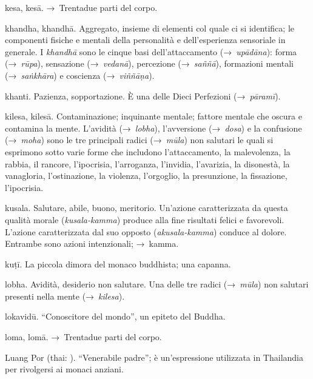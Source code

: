 \begin{glossarydescription}
\item[kesa, kesā.] →~Trentadue parti del corpo.

\item[khandha, khandhā.] Aggregato, insieme di elementi col quale ci si
  identifica; le componenti fisiche e mentali della personalità e
  dell'esperienza sensoriale in generale. I \emph{khandhā} sono le cinque basi
  dell'attaccamento (→~\emph{upādāna}): forma (→~\emph{rūpa}), sensazione
  (→~\emph{vedanā}), percezione (→~\emph{saññā}), formazioni mentali
  (→~\emph{saṅkhāra}) e coscienza (→~\emph{viññāṇa}).

\item[khanti.] Pazienza, sopportazione. È una delle Dieci Perfezioni
  (→~\emph{pāramī}).

\item[kilesa, kilesā.] Contaminazione; inquinante mentale; fattore mentale
  che oscura e contamina la mente. L'avidità (→~\emph{lobha}), l'avversione
  (→~\emph{dosa}) e la confusione (→~\emph{moha}) sono le tre principali radici
  (→~\emph{mūla}) non salutari le quali si esprimono sotto varie forme che
  includono l'attaccamento, la malevolenza, la rabbia, il rancore, l'ipocrisia,
  l'arroganza, l'invidia, l'avarizia, la disonestà, la vanagloria,
  l'ostinazione, la violenza, l'orgoglio, la presunzione, la fissazione,
  l'ipocrisia.

\item[kusala.] Salutare, abile, buono, meritorio. Un'azione caratterizzata
  da questa qualità morale (\emph{kusala-kamma}) produce alla fine risultati
  felici e favorevoli. L'azione caratterizzata dal suo opposto
  (\emph{akusala-kamma}) conduce al dolore. Entrambe sono azioni intenzionali;
  →~kamma.

\item[kuṭī.] La piccola dimora del monaco buddhista; una capanna.


\item[lobha.] Avidità, desiderio non salutare. Una delle tre radici
  (→~\emph{mūla}) non salutari presenti nella mente (→~\emph{kilesa}).

\item[lokavidū.] ``Conoscitore del mondo'', un epiteto del Buddha.

\item[loma, lomā.] →~Trentadue parti del corpo.

\item[Luang Por] (thai: ). ``Venerabile padre''; è un'espressione
  utilizzata in Thailandia per rivolgersi ai monaci anziani.


\end{glossarydescription}
